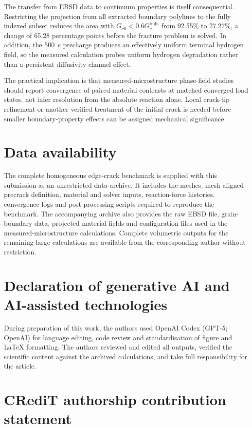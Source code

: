 \documentclass[preprint,12pt]{elsarticle}
\begin{document}
The transfer from EBSD data to continuum properties is itself consequential. Restricting the projection from all extracted boundary polylines to the fully indexed subset reduces the area with $G_{c0}<0.6G_c^{\mathrm{bulk}}$ from 92.55\% to 27.27\%, a change of 65.28 percentage points before the fracture problem is solved. In addition, the 500~s precharge produces an effectively uniform terminal hydrogen field, so the measured calculation probes uniform hydrogen degradation rather than a persistent diffusivity-channel effect.

The practical implication is that measured-microstructure phase-field studies should report convergence of paired material contrasts at matched converged load states, not infer resolution from the absolute reaction alone. Local crack-tip refinement or another verified treatment of the initial crack is needed before smaller boundary-property effects can be assigned mechanical significance.
\section*{Data availability}

The complete homogeneous edge-crack benchmark is supplied with this submission
as an unrestricted data archive. It includes the meshes, mesh-aligned precrack
definition, material and solver inputs, reaction-force histories, convergence
logs and post-processing scripts required to reproduce the benchmark. The
accompanying archive also provides the raw EBSD file, grain-boundary data,
projected material fields and configuration files used in the
measured-microstructure calculations. Complete volumetric outputs for the
remaining large calculations are available from the corresponding author
without restriction.
\section*{Declaration of generative AI and AI-assisted technologies}
During preparation of this work, the authors used OpenAI Codex (GPT-5; OpenAI) for
language editing, code review and standardisation of figure and LaTeX formatting.
The authors reviewed and edited all outputs, verified the scientific content
against the archived calculations, and take full responsibility for the article.

\section*{CRediT authorship contribution statement}
\end{document}
